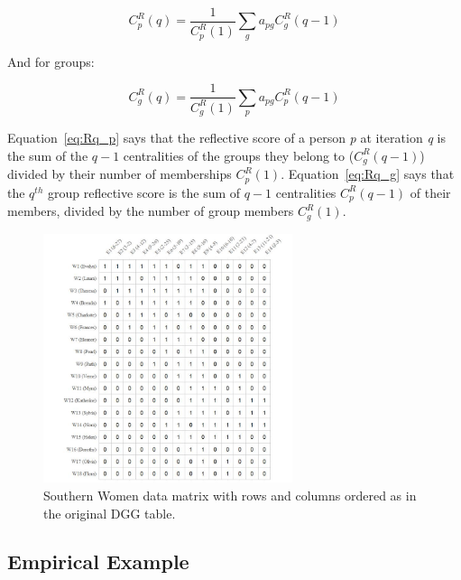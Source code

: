 \documentclass[a4paper,fleqn]{cas-sc}
\begin{document}
\begin{equation}   
    C^R_p(q) = \frac{1}{C^R_p(1)}\sum_g a_{pg}C^R_g(q-1) 
   \label{eq:Rq_p}
\end{equation}

And for groups:

\begin{equation}
   C^R_g(q) = \frac{1}{C^R_g(1)}\sum_p a_{pg}C^R_p(q-1)
   \label{eq:Rq_g}
\end{equation}

Equation~\ref{eq:Rq_p} says that the reflective score of a person \textit{p} at iteration \textit{q} is the sum of the $q-1$ centralities of the groups they belong to ($C^R_g(q-1)$) divided by their number of memberships $C^{R}_p(1)$. Equation~\ref{eq:Rq_g} says that the $q^{th}$ group reflective score is the sum of $q-1$ centralities $C^R_p(q-1)$ of their members, divided by the number of group members $C^R_g(1)$.

\begin{figure}[ht!]
    \captionsetup[subfigure]{font=footnotesize,labelfont=footnotesize}
    \centering
    \includegraphics[width=0.65\textwidth]{Plots/southern-women.jpg}
    \caption{Southern Women data matrix with rows and columns ordered as in the original DGG table.}
    \label{fig:sw}
\end{figure}

\subsection{Empirical Example} \label{subsec:ex}
\end{document}
